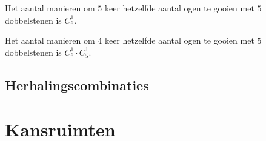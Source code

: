 \documentclass[main.tex]{subfiles}
\begin{document}
\begin{vb}
  Het aantal manieren om $5$ keer hetzelfde aantal ogen te gooien met $5$ dobbelstenen is $C_{6}^{1}$.
\end{vb}

\begin{vb}
  Het aantal manieren om $4$ keer hetzelfde aantal ogen te gooien met $5$ dobbelstenen is $C_{6}^{1}\cdot C_{5}^{1}$.
\end{vb}

\subsection*{Herhalingscombinaties}

\newpage 
\section{Kansruimten}
\end{document}
